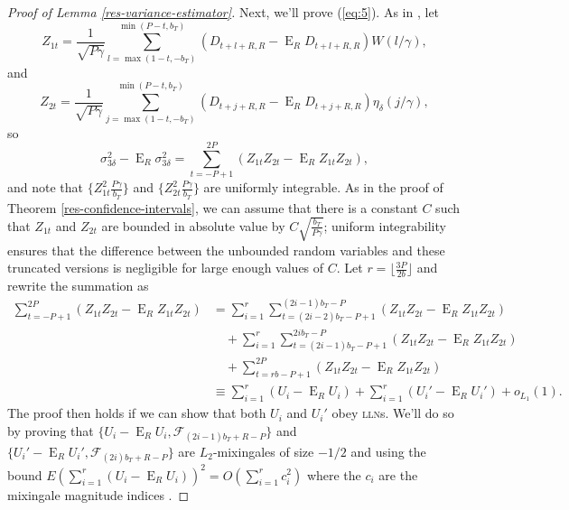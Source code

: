 \documentclass[11pt]{article}
\DeclareMathOperator{\E}{E}
\newcommand{\kernelB}[1]{\ensuremath{\eta_{\delta}(#1)}}
\newcommand{\vtSum}{\ensuremath{\sum_{t=-P+1}^{2P}}}
\newcommand{\vtSumr}{\ensuremath{\sum_{i=1}^r}}
\newcommand{\vtSuma}{\ensuremath{\sum_{t=(2i-2)b_T-P+1}^{(2i-1)b_T-P}}}
\newcommand{\vtSumb}{\ensuremath{\sum_{t=(2i-1)b_T-P+1}^{2ib_T-P}}}
\newcommand{\vttLower}{\ensuremath{\max(1-t,-b_T)}}
\newcommand{\vttUpper}{\ensuremath{\min(P-t,b_T)}}
\newcommand{\varianceTermIIIa}{\ensuremath{\frac1{\sqrt{P\gamma}}
    \sum_{l=\vttLower}^{\vttUpper} (D_{t+l+R,R} - \E_R D_{t+l+R,R})
    W(l/\gamma)}}
\newcommand{\varianceTermIV}{\ensuremath{\sigma_{3\delta}^{2}}}
\newcommand{\varianceTermIVb}{\ensuremath{\frac1{\sqrt{P\gamma}}
    \sum_{j=\vttLower}^{\vttUpper} (D_{t+j+R,R} - \E_R D_{t+j+R,R})
    \kernelB{j/\gamma}}}
\newcommand{\vtIIIsummand}{\ensuremath{(Z_{1t}Z_{2t} - \E_RZ_{1t}Z_{2t})}}
\newcommand{\lln}{\textsc{lln}}
\begin{document}
\begin{proof}[Proof of Lemma \ref{res-variance-estimator}]
\newcommand{\UFiltration}[1]{\ensuremath{\mathcal{F}_{(#1)b_{T}+R-P}}}%
Next, we'll prove (\ref{eq:5}). As in \citet{JoD:00}, let
\begin{equation*}
  Z_{1t} = \varianceTermIIIa,
\end{equation*}
and
\begin{equation*}
  Z_{2t} = \varianceTermIVb,
\end{equation*}
so
\begin{equation*}
  \varianceTermIV - \E_R \varianceTermIV = \vtSum (Z_{1t}Z_{2t} - \E_R Z_{1t}Z_{2t}),
\end{equation*}
and note that $\{Z_{1t}^2 \frac{P\gamma}{b_T}\}$ and $\{Z_{2t}^2
\frac{P\gamma}{b_T}\}$ are uniformly integrable.  As in the proof of Theorem
\ref{res-confidence-intervals}, we can assume that there is a constant
$C$ such that $Z_{1t}$ and $Z_{2t}$ are bounded in absolute value by
$C\sqrt{\frac{b_T}{P\gamma}}$; uniform integrability ensures that the
difference between the unbounded random variables and these truncated
versions is negligible for large enough values of $C$.  Let $r =
\lfloor \frac{3P}{2b} \rfloor$ and rewrite the summation as
\begin{align*}
  \vtSum \vtIIIsummand &= \vtSumr \vtSuma \vtIIIsummand \\
  &\quad+ \vtSumr \vtSumb \vtIIIsummand \\
  &\quad+ \sum_{t=r b - P + 1}^{2P} \vtIIIsummand \\
  &\equiv \vtSumr (U_i - \E_R U_i) + \vtSumr (U_i' - \E_R U_i') + o_{L_1}(1).
\end{align*}
The proof then holds if we can show that both $U_i$ and $U_i'$ obey
\lln s.  We'll do so by proving that $\{U_i -\E_R U_i,
\UFiltration{2i-1}\}$ and $\{U_i' - \E_R U_i', \UFiltration{2i}\}$ are
$L_2$-mixingales of size $-1/2$ and using the bound $E(\vtSumr (U_i -
\E_R U_i))^2 = O(\vtSumr c_i^2)$ where the $c_i$ are the mixingale
magnitude indices \citep{Mcl:75}.


\end{proof}
\end{document}

